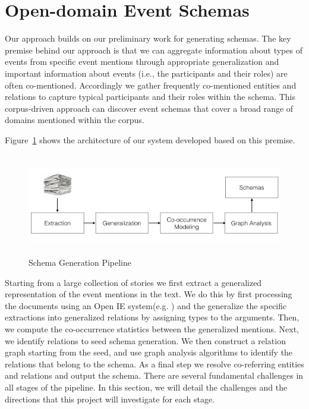 \section{Open-domain Event Schemas}
\label{sec:schemas}
Our approach builds on our preliminary work for generating schemas. The key premise behind our approach is that we can aggregate information about types of events from specific event mentions through appropriate generalization and important information about events (i.e., the participants and their roles) are often co-mentioned. Accordingly we gather frequently co-mentioned entities and relations to capture typical participants and their roles within the schema. This corpus-driven approach can discover event schemas that cover a broad range of domains mentioned within the corpus. 

Figure~\ref{fig:schema-generation} shows the architecture of our system developed based on this premise. 
\begin{figure}[htbp]
\vspace{-2ex}
\begin{center}
\includegraphics[height=1.75in, width=5.25in]{figures/schema-architecture}
\vspace{-4ex}
\caption{\label{fig:schema-generation}Schema Generation Pipeline}
\end{center}
\vspace{-2ex}
\end{figure}
Starting from a large collection of stories we first extract a generalized representation of the event mentions in the text. 
We do this by first processing the documents using an Open IE system(e.g. \cite{mausam-emnlp12}) and the generalize the specific extractions into generalized relations by assigning types to the arguments. Then, we compute the co-occurrence statistics between the generalized mentions. Next, we identify relations to seed schema generation. We then construct a relation graph starting from the seed, and use graph analysis algorithms to identify the relations that belong to the schema. As a final step we resolve co-referring entities and relations and output the schema. There are several fundamental challenges in all stages of the pipeline. In this section, we will detail the challenges and the directions that this project will investigate for each stage.
 
